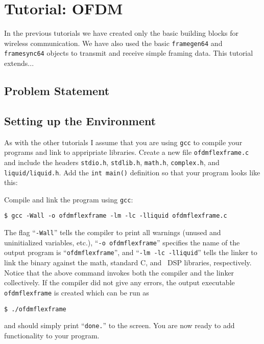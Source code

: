 % 
%

\newpage
\section{Tutorial: OFDM}
\label{tutorial:ofdmflexframe}

In the previous tutorials we have created only the basic building blocks
for wireless communication.
We have also used the basic {\tt framegen64} and {\tt framesync64}
objects to transmit and receive simple framing data.
This tutorial extends...


%
%
\subsection{Problem Statement}
\label{tutorial:ofdmflexframe:problem}



%
%
\subsection{Setting up the Environment}
\label{tutorial:ofdmflexframe:environment}

As with the other tutorials I assume that you are using {\tt gcc} to
compile your programs and link to appripriate libraries.
Create a new file {\tt ofdmflexframe.c} and include the headers
{\tt stdio.h},
{\tt stdlib.h},
{\tt math.h},
{\tt complex.h}, and
{\tt liquid/liquid.h}.
Add the {\tt int main()} definition so that your program looks like
this:
%

%
Compile and link the program using {\tt gcc}:
%
\begin{Verbatim}[fontsize=\small]
    $ gcc -Wall -o ofdmflexframe -lm -lc -lliquid ofdmflexframe.c
\end{Verbatim}
%
The flag ``{\tt -Wall}'' tells the compiler to print all warnings
(unused and uninitialized variables, etc.),
``{\tt -o ofdmflexframe}'' specifies the name of the output program is
``{\tt ofdmflexframe}'', and
``{\tt -lm -lc -lliquid}'' tells the linker to link the binary against
the math, standard C, and \liquid\ DSP libraries, respectively.
Notice that the above command invokes both the compiler and the linker
collectively.
%
If the compiler did not give any errors, the output executable
{\tt ofdmflexframe} is created which can be run as
%
\begin{Verbatim}[fontsize=\small]
    $ ./ofdmflexframe
\end{Verbatim}
%
and should simply print ``{\tt done.}'' to the screen.
You are now ready to add functionality to your program.



